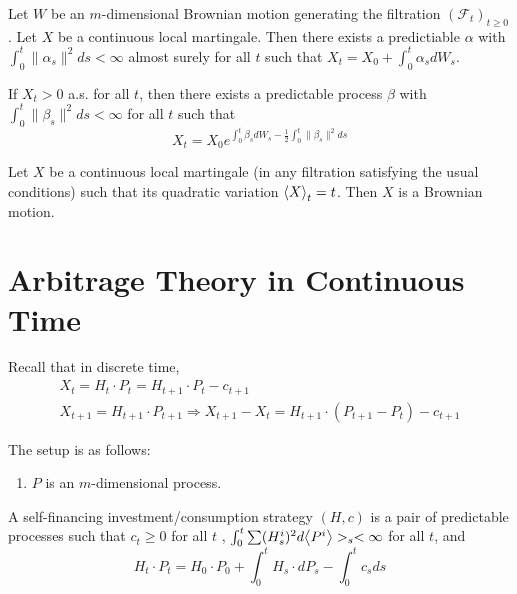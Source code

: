 \begin{thm}
  \label{defn:continuous_time:16}
  Let $W$ be an $m$-dimensional Brownian motion generating the
  filtration $(\mathcal{F}_{t})_{t \geq 0}$.
  Let $X$ be a continuous local martingale.  Then there exists a
  predictiable $\alpha$ with $\int_{0}^{t} \| \alpha_{s} \|^{2} ds <
  \infty$ almost surely for all $t$ such that $X_{t} = X_{0} +
  \int_{0}^{t} \alpha_{s} dW_{s}$.

  If $X_{t} > 0$ a.s. for all $t$, then there exists a predictable
  process $\beta$ with $\int_{0}^{t} \| \beta_{s} \|^{2} ds < \infty$
  for all $t$ such that
  \begin{equation}
    \label{eq:54}
    X_{t} = X_{0} e^{\int_{0}^{t} \beta_{s} dW_{s} - \frac{1}{2}
      \int_{0}^{t} \| \beta_{s} \|^{2} ds}
  \end{equation}
\end{thm}

\begin{thm}
  \label{defn:continuous_time:17}
  Let $X$ be a continuous local martingale (in any filtration
  satisfying the usual conditions) such that its quadratic variation
  $\IP{ X }_{t} = t$.  Then $X$ is a Brownian motion.
\end{thm}


\section{Arbitrage Theory in Continuous Time}
\label{sec:arbitr-theory-cont}

Recall that in discrete time,
\begin{align}
  \label{eq:55}
  X_{t} = H_{t} \cdot P_{t} = H_{t+1} \cdot P_{t} - c_{t+1} \\
  X_{t+1} = H_{t+1} \cdot P_{t+1} \Rightarrow X_{t+1} - X_{t} =
  H_{t+1} \cdot (P_{t+1} - P_{t}) - c_{t+1}
\end{align}

The setup is as follows:
\begin{enumerate}
\item $P$ is an $m$-dimensional \ito process.
\end{enumerate}

\begin{defn}
  \label{defn:continuous_time:18}
  A self-financing investment/consumption strategy $(H, c)$ is a pair
  of predictable processes such that $c_{t} \geq 0$ for all $t$ ,
  $\int_{0}^{t} \sum (H_{s}^{i})^{2} d \IP{ P^{i} }>_{s} <
  \infty$ for all $t$, and
  \begin{equation}
    \label{eq:56}
    H_{t} \cdot P_{t} = H_{0} \cdot P_{0} + \int_{0}^{t} H_{s} \cdot
    dP_{s} - \int_{0}^{t} c_{s} ds
  \end{equation}
\end{defn}

